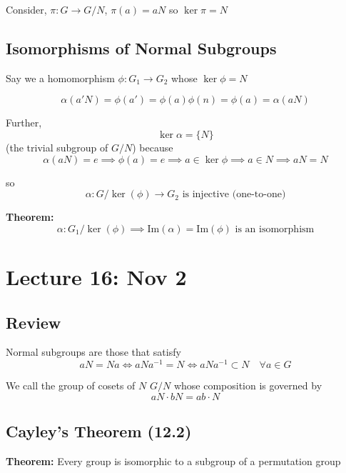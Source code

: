 \documentclass[12pt]{report}
\begin{document}
        Consider, $\pi: G \to G/N$, $\pi(a) = aN$ so $\ker \pi = N$

    \subsection*{Isomorphisms of Normal Subgroups}
        Say we a homomorphism $\phi: G_1 \to G_2$ whose $\ker \phi = N$ 

        \begin{center}
        \end{center}

        \[\alpha(a' N) = \phi(a') = \phi(a)\phi(n) = \phi(a) = \alpha(aN)\]

        Further, 
        \[\ker \alpha = \{N\}\]
        (the trivial subgroup of $G/N$)
        because 
        \[\alpha(aN) = e \implies \phi(a) = e \implies a\in \ker \phi \implies a \in N \implies aN = N\]

        so 
        \[\alpha: G/\ker(\phi) \to G_2 \text{ is injective (one-to-one)}\]

        \textbf{Theorem:} 
        \[\alpha: G_1/\ker(\phi) \implies \text{Im}(\alpha) = \text{Im}(\phi) \text{ is an isomorphism}\]

\section*{Lecture 16: Nov 2}
    \subsection*{Review}
        Normal subgroups are those that satisfy 
        \[aN = Na \iff aNa^{-1} = N \iff aNa^{-1} \subset N \quad \forall a \in G\]

        We call the group of cosets of $N$ $G/N$ whose composition is governed by 
        \[aN \cdot bN = ab \cdot N\]


    \subsection*{Cayley's Theorem (12.2)}
        \textbf{Theorem:} Every group is isomorphic to a subgroup of a permutation group 
\end{document}
